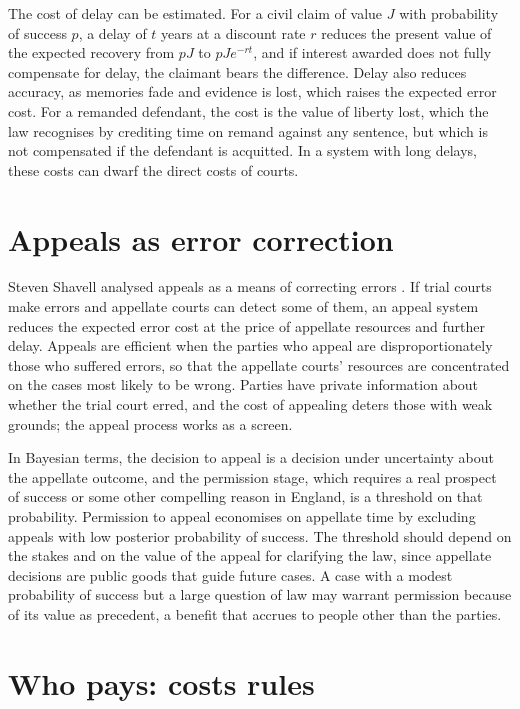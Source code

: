The cost of delay can be estimated. For a civil claim of value $J$ with probability of success $p$, a delay of $t$ years at a discount rate $r$ reduces the present value of the expected recovery from $pJ$ to $pJ e^{-rt}$, and if interest awarded does not fully compensate for delay, the claimant bears the difference. Delay also reduces accuracy, as memories fade and evidence is lost, which raises the expected error cost. For a remanded defendant, the cost is the value of liberty lost, which the law recognises by crediting time on remand against any sentence, but which is not compensated if the defendant is acquitted. In a system with long delays, these costs can dwarf the direct costs of courts.

\section{Appeals as error correction}

Steven Shavell analysed appeals as a means of correcting errors \citep{shavell1995}. If trial courts make errors and appellate courts can detect some of them, an appeal system reduces the expected error cost at the price of appellate resources and further delay. Appeals are efficient when the parties who appeal are disproportionately those who suffered errors, so that the appellate courts' resources are concentrated on the cases most likely to be wrong. Parties have private information about whether the trial court erred, and the cost of appealing deters those with weak grounds; the appeal process works as a screen.

In Bayesian terms, the decision to appeal is a decision under uncertainty about the appellate outcome, and the permission stage, which requires a real prospect of success or some other compelling reason in England, is a threshold on that probability. Permission to appeal economises on appellate time by excluding appeals with low posterior probability of success. The threshold should depend on the stakes and on the value of the appeal for clarifying the law, since appellate decisions are public goods that guide future cases. A case with a modest probability of success but a large question of law may warrant permission because of its value as precedent, a benefit that accrues to people other than the parties.

\section{Who pays: costs rules}

